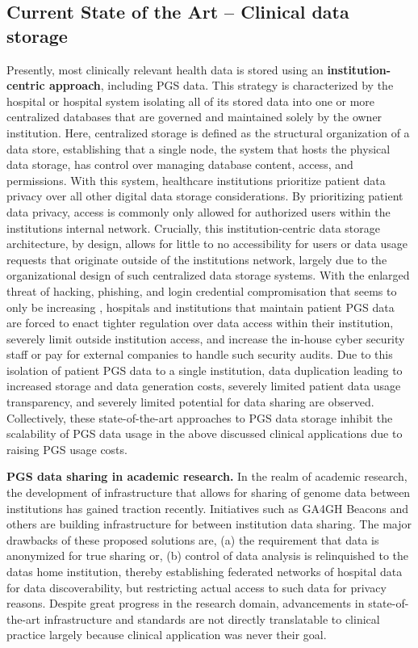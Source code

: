 \documentclass[runningheads]{llncs}
\begin{document}
\subsection{Current State of the Art -- Clinical data storage}
Presently, most clinically relevant health data is stored using an \textbf{institution-centric approach}, including PGS data. 
This strategy is characterized by the hospital or hospital system isolating all of its stored data into one or more centralized databases that are governed and maintained solely by the owner institution. 
Here, centralized storage is defined as the structural organization of a data store, establishing that a single node, the system that hosts the physical data storage, has control over managing database content, access, and permissions. 
With this system, healthcare institutions prioritize patient data privacy over all other digital data storage considerations. 
By prioritizing patient data privacy, access is commonly only allowed for authorized users within the institution\textquotesingle s internal network. 
Crucially, this institution-centric data storage architecture, by design, allows for little to no accessibility for users or data usage requests that originate outside of the institution\textquotesingle s network, largely due to the organizational design of such centralized data storage systems. 
With the enlarged threat of hacking, phishing, and login credential compromisation that seems to only be increasing \cite{noauthor_ransomware_nodate}, hospitals and institutions that maintain patient PGS data are forced to enact tighter regulation over data access within their institution, severely limit outside institution access, and increase the in-house cyber security staff or pay for external companies to handle such security audits.  
Due to this isolation of patient PGS data to a single institution, data duplication leading to increased storage and data generation costs, severely limited patient data usage transparency, and severely limited potential for data sharing are observed. 
Collectively, these state-of-the-art approaches to PGS data storage inhibit the scalability of PGS data usage in the above discussed clinical applications due to raising PGS usage costs.

\textbf{PGS data sharing in academic research.}
In the realm of academic research, the development of infrastructure that allows for sharing of genome data between institutions has gained traction recently. 
Initiatives such as GA4GH Beacons \cite{rambla_beacon_2022} and others are building infrastructure for between institution data sharing. 
The major drawbacks of these proposed solutions are, (a) the requirement that data is anonymized for true sharing or, (b) control of data analysis is relinquished to the data\textquotesingle s home institution, thereby establishing federated networks of hospital data for data discoverability, but restricting actual access to such data for privacy reasons.
Despite great progress in the research domain, advancements in state-of-the-art infrastructure and standards are not directly translatable to clinical practice largely because clinical application was never their goal. 
\end{document}
